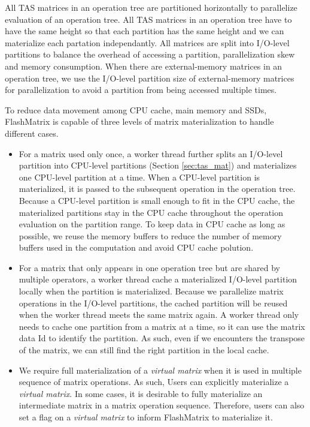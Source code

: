All TAS matrices in an operation tree are partitioned horizontally to parallelize
evaluation of an operation tree. All TAS matrices in an operation tree have to
have the same height so that each partition has the same height and we can
materialize each partation independantly. All matrices are split into I/O-level
partitions to balance the overhead of accessing a partition, parallelization
skew and memory consumption. When there are external-memory matrices in
an operation tree, we use the I/O-level partition size of external-memory
matrices for parallelization to avoid a partition from being accessed multiple
times.

To reduce data movement among CPU cache, main memory and SSDs, FlashMatrix is
capable of three levels of matrix materialization to handle different cases.
\begin{itemize}
\item For a matrix used only once, a worker thread further splits an I/O-level
	partition into CPU-level partitions (Section \ref{sec:tas_mat}) and
	materializes one CPU-level partition at a time. When a CPU-level partition
	is materialized, it is passed to the subsequent operation in the operation
	tree. Because a CPU-level partition is small enough to fit in the CPU cache,
	the materialized partitions stay in the CPU cache throughout the operation
	evaluation on the partition range. To keep data in CPU cache as long as possible,
	we reuse the memory buffers to reduce the number of memory buffers used
	in the computation and avoid CPU cache polution.
\item For a matrix that only appears in one operation tree but are shared by
	multiple operators, a worker thread cache a materialized I/O-level partition
	locally when the partition is materialized. Because we parallelize matrix
	operations in the I/O-level partitions, the cached partition will be reused
	when the worker thread meets the same matrix again. A worker thread only needs
	to cache one partition from a matrix at a time, so it can use the matrix data
	Id to identify the partition. As such, even if we encounters the transpose
	of the matrix, we can still find the right partition in the local cache.
\item We require full materialization of a \textit{virtual matrix}
	when it is used in multiple sequence of matrix operations. As such,
	Users can explicitly materialize a \textit{virtual matrix}. In some cases,
	it is desirable to fully materialize an intermediate matrix in a matrix
	operation sequence. Therefore, users can also set a flag on a
	\textit{virtual matrix} to inform FlashMatrix to materialize it.
\end{itemize}

